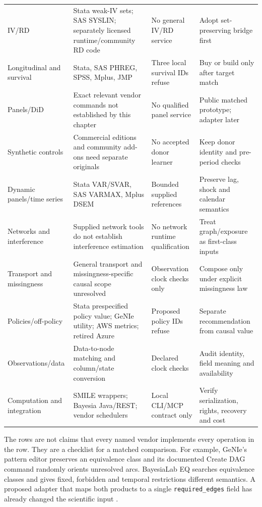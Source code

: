 \begin{longtable}{@{}P{.18\linewidth}P{.29\linewidth}P{.21\linewidth}P{.23\linewidth}@{}}
IV/RD & Stata weak-IV sets; SAS SYSLIN; separately licensed runtime/community RD code & No general IV/RD service & Adopt set-preserving bridge first \\
Longitudinal and survival & Stata, SAS PHREG, SPSS, Mplus, JMP & Three local survival IDs refuse & Buy or build only after target match \\
Panels/DiD & Exact relevant vendor commands not established by this chapter & No qualified panel service & Public matched prototype; adapter later \\
Synthetic controls & Commercial editions and community add-ons need separate originals & No accepted donor learner & Keep donor identity and pre-period checks \\
Dynamic panels/time series & Stata VAR/SVAR, SAS VARMAX, Mplus DSEM & Bounded supplied references & Preserve lag, shock and calendar semantics \\
Networks and interference & Supplied network tools do not establish interference estimation & No network runtime qualification & Treat graph/exposure as first-class inputs \\
Transport and missingness & General transport and missingness-specific causal scope unresolved & Observation clock checks only & Compose only under explicit missingness law \\
Policies/off-policy & Stata prespecified policy value; GeNIe utility; AWS metrics; retired Azure & Proposed policy IDs refuse & Separate recommendation from causal value \\
Observations/data & Data-to-node matching and column/state conversion & Declared clock checks & Audit identity, field meaning and availability \\
Computation and integration & SMILE wrappers; Bayesia Java/REST; vendor schedulers & Local CLI/MCP contract only & Verify serialization, rights, recovery and cost \\
\bottomrule
\end{longtable}
\endgroup

The rows are not claims that every named vendor implements every operation in
the row. They are a checklist for a matched comparison. For example, GeNIe's
pattern editor preserves an equivalence class and its documented Create DAG
command randomly orients unresolved arcs. BayesiaLab EQ searches equivalence
classes and gives fixed, forbidden and temporal restrictions different
semantics. A proposed adapter that maps both products to a single
\texttt{required\_edges} field has already changed the scientific input
\citep{exec13_genie_pattern,exec13_genie_bs,exec13_bayesia_eq}.

